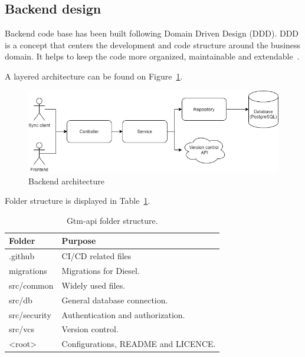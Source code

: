 \subsection{Backend design}\label{subsec:backend-design}
Backend code base has been built following Domain Driven Design (DDD).
DDD is a concept that centers the development and code structure around the business domain.
It helps to keep the code more organized, maintainable and extendable~\cite{domain-driven-design}.

A layered architecture can be found on Figure~\ref{fig:backend-layered-diagram}.
\begin{figure}[H]
    \includegraphics[width=\textwidth]{figures/backend_layered_diagram}
    \caption{Backend architecture}
    \label{fig:backend-layered-diagram}
\end{figure}

Folder structure is displayed in Table~\ref{tab:gtm-api-folder-structure}.
\begin{table}[h]
    \centering
    \begin{tabular}{ | p{3cm} | p{10cm} |}
        \hline
        \textbf{Folder} & \textbf{Purpose}\\
        \hline
        .github & CI/CD related files\\
        \hline
        migrations & Migrations for Diesel. \\
        \hline
        src/common & Widely used files.\\
        \hline
        src/db & General database connection.\\
        \hline
        src/security & Authentication and authorization.\\
        \hline
        src/vcs & Version control.\\
        \hline
        <root> & Configurations, README and LICENCE.\\
        \hline
    \end{tabular}
    \caption{Gtm-api folder structure.}
    \label{tab:gtm-api-folder-structure}
\end{table}


